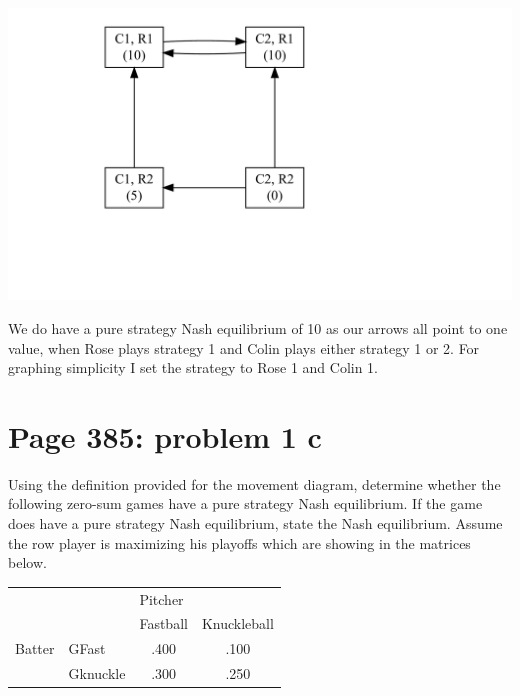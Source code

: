 \documentclass[]{article}
\begin{document}
\includegraphics{Christophe_Hunt_hw9_files/figure-latex/unnamed-chunk-1-1.pdf}

We do have a pure strategy Nash equilibrium of 10 as our arrows all
point to one value, when Rose plays strategy 1 and Colin plays either
strategy 1 or 2. For graphing simplicity I set the strategy to Rose 1
and Colin 1.

\newpage

\section{Page 385: problem 1 c}\label{page-385-problem-1-c}

Using the definition provided for the movement diagram, determine
whether the following zero-sum games have a pure strategy Nash
equilibrium. If the game does have a pure strategy Nash equilibrium,
state the Nash equilibrium. Assume the row player is maximizing his
playoffs which are showing in the matrices below.

\begin{table}[!h]
\centering
\begin{tabular}{lllc}
 &  & \multicolumn{2}{l}{Pitcher} \\ \cline{3-4}
 &  & Fastball & \multicolumn{1}{l}{Knuckleball} \\ \hline
Batter & GFast & \multicolumn{1}{c}{.400} & .100 \\
 & Gknuckle & \multicolumn{1}{c}{.300} & .250 \\ \hline
\end{tabular}
\end{table}
\end{document}
